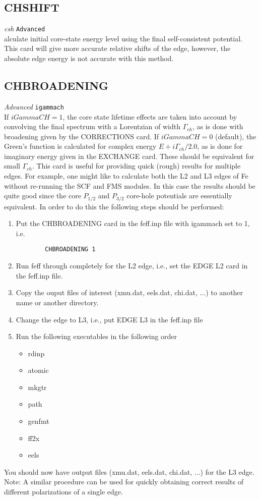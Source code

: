 \documentclass[11pt,oneside]{report} %
\newenvironment{Card}[4]%
      {\vspace{3ex}%
        \subsection{#1}
        \quad\textsl{#3}\newline
        \quad\texttt{#2}\newline%
        \label{card:#4}\\}
      {}
\begin{document}
\begin{Card}{CHSHIFT}{Advanced}{csh}
  Calculate initial core-state energy level using the final self-consistent potential. This card will give more accurate relative shifts of the edge, however, the absolute edge energy is not accurate with this method.
\end{Card}



\begin{Card}{CHBROADENING}{igammach}{Advanced}{chb}
  If $iGammaCH = 1$, the core state lifetime effects are taken into
  account by convolving the final spectrum with a Lorentzian of width
  $\Gamma_{ch}$, as is done with broadening given by the CORRECTIONS
  card.  If $iGammaCH = 0$ (default), 
  the Green's function is calculated for complex energy $E +
  i\Gamma_{ch}/2.0$, as is done for imaginary energy given in the
  EXCHANGE card. These should be equivalent for small
  $\Gamma_{ch}$. This card is useful for providing quick (rough) results for
  multiple edges. For
  example, one might like to calculate both the L2 and L3 edges of Fe
  without re-running the SCF and FMS modules. In this case the results
  should be quite good since the core $P_{1/2}$ and $P_{3/2}$
  core-hole potentials are essentially equivalent. In order to do this
  the following steps should be performed:

  \begin{enumerate}
    \item{Put the CHBROADENING card in the feff.inp file with igammach
    set to 1, i.e.
    \begin{verbatim}
        CHBROADENING 1
    \end{verbatim}}
    \item{Run feff through completely for the L2 edge, i.e., set
    the EDGE L2 card in the feff.inp file.}
    \item{Copy the ouput files of interest (xmu.dat, eels.dat, chi.dat,
    ...) to another name or another directory.}
    \item{Change the edge to L3, i.e., put EDGE L3 in the feff.inp
    file}
    \item{Run the following executables in the following order
      \begin{itemize}
	\item{rdinp}
	\item{atomic}
	\item{mkgtr}
	\item{path}
	\item{genfmt}
	\item{ff2x}
	\item{eels}
      \end{itemize}}
  \end{enumerate}

  You should now have output files (xmu.dat, eels.dat, chi.dat, ...)
  for the L3 edge. Note: A similar procedure can be used for quickly obtaining
  correct results of different polarizations of a single edge.
\end{Card}
\end{document}
